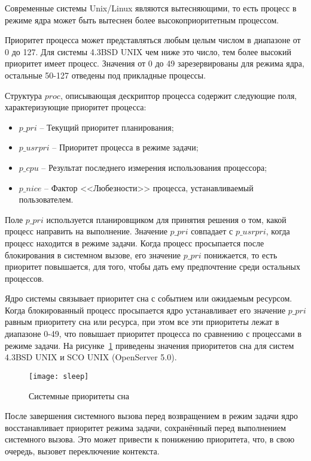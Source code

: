 Современные системы Unix/Linux являются вытесняющими, то есть процесс в режиме ядра может быть вытеснен более высокоприоритетным процессом.

Приоритет процесса может представляться любым целым числом в диапазоне от 0 до 127. Для системы  4.3BSD UNIX чем ниже это число, тем более высокий приоритет имеет процесс. Значения от 0 до 49 зарезервированы для режима ядра, остальные 50-127 отведены под прикладные процессы.

Структура $proc$, описывающая дескриптор процесса содержит следующие поля, характеризующие приоритет процесса:

\begin{itemize}
	\item $p\_pri$ -- Текущий приоритет планирования;
	\item $p\_usrpri$ -- Приоритет процесса в режиме задачи;
	\item $p\_cpu$ -- Результат последнего измерения использования процессора;
	\item $p\_nice$ -- Фактор <<Любезности>> процесса, устанавливаемый пользователем.
\end{itemize}

Поле $p\_pri$ используется планировщиком для принятия решения о том, какой процесс направить на выполнение. Значение $p\_pri$ совпадает с $p\_usrpri$, когда процесс находится в режиме задачи. Когда процесс просыпается после блокирования в системном вызове, его значение $p\_pri$ понижается, то есть приоритет повышается, для того, чтобы дать ему предпочтение среди остальных процессов.


Ядро системы связывает приоритет сна с событием или ожидаемым ресурсом. Когда блокированный процесс просыпается ядро устанавливает его значение $p\_pri$ равным приоритету сна или ресурса, при этом все эти приоритеты лежат в диапазоне 0-49, что повышает приоритет процесса по сравнению с процессами в режиме задачи. На рисунке~\ref{fig:sleep} приведены значения приоритетов сна для систем 4.3BSD UNIX и SCO
UNIX (OpenServer 5.0).

\begin{figure}[H]
	\centering
	\texttt{[image: sleep]}
	\caption{Системные приоритеты сна}
	\label{fig:sleep}
\end{figure}

После завершения системного вызова перед возвращением в режим задачи ядро восстанавливает приоритет режима задачи, сохранённый перед выполнением системного вызова. Это может привести к понижению приоритета, что, в свою очередь, вызовет переключение контекста.

